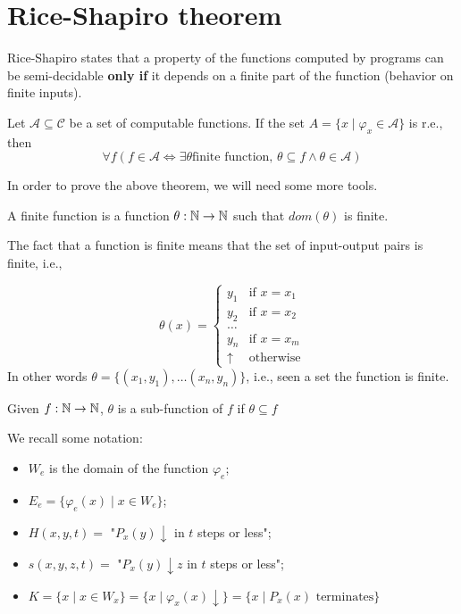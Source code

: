 \chapter {Rice-Shapiro theorem}
Rice-Shapiro states that a property of the functions computed by
programs can be semi-decidable \textbf{only if} it depends on a finite
part of the function (behavior on finite inputs). 
\begin{theorem}
  Let $\mathcal{A} \subseteq \mathcal{C}$ be a set of computable
  functions. If the set $A = \{x \mid \varphi_x \in \mathcal{A}\}$ is
  r.e., then
  \[
    \forall f (f \in \mathcal{A} \Leftrightarrow \exists \theta \mbox{
      finite function, } \theta \subseteq f \land \theta \in
    \mathcal{A})
  \]

\end{theorem}

In order to prove the above theorem, we will need some more tools.

\begin{definition}
  A finite function is a function $\theta: \mathbb{N}\rightarrow\mathbb{N}$
  such that $dom(\theta)$ is finite.
\end{definition}

The fact that a function is finite means that the set of
input-output pairs is finite, i.e.,

\[
  \theta(x) =
  \begin{cases}
    y_1 & \mbox{if $x=x_1$}\\
    y_2 & \mbox{if $x=x_2$}\\
    \ldots\\
    y_n & \mbox{if $x=x_m$}\\
    \uparrow & \mbox{otherwise}
  \end{cases}
\]In other words
  $\theta = \{(x_1,y_1),\dots(x_n,y_n) \}$, i.e., seen a set the function is finite.

\begin{definition}
  Given $f:\mathbb{N}\rightarrow\mathbb{N}$, $\theta$ is a sub-function of
$f$ if $\theta \subseteq f$
\end{definition}


\begin{notation}
  We recall some notation:
  \begin{itemize}
  \item $ W_e $ is the domain of the function $\varphi_e$;
  \item $ E_e = \{\varphi_e(x) \mid x\in W_e \}$;
  \item $ H(x,y,t) = $ "$P_x(y)\downarrow$ in $t$ steps or less";
  \item $ s(x,y,z,t) =$ "$ P_x(y)\downarrow z$ in $t$ steps or less";
  \item $ K = \{x \mid x\in W_x \} = \{x\mid \varphi_x(x)\downarrow \} =
    \{x\mid P_x(x) \mbox{ terminates} \}$
  \end{itemize}
\end{notation}

